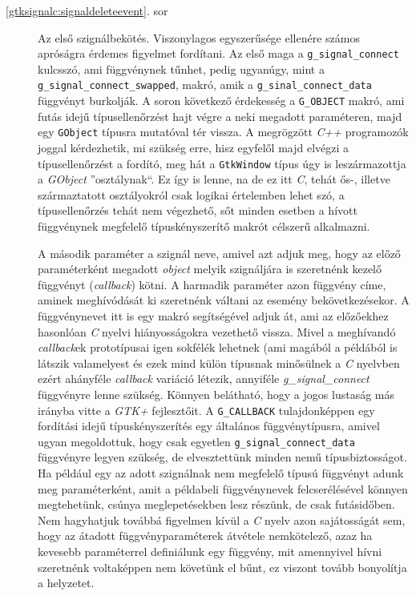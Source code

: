 \begin{description}
 \item[\ref{gtksignalc:signaldeleteevent}. sor] Az első szignálbekötés. Viszonylagos egyszerűsége ellenére számos apróságra érdemes figyelmet fordítani. Az első maga a \texttt{g\_signal\_connect} kulcsszó, ami függvénynek tűnhet, pedig ugyanúgy, mint a \texttt{g\_signal\_connect\_swapped}, makró, amik a \texttt{g\_sinal\_connect\_data} függvényt burkolják. A soron következő érdekesség a \texttt{G\_OBJECT} makró, ami futás idejű típusellenőrzést hajt végre a neki megadott paraméteren, majd egy \texttt{GObject} típusra mutatóval tér vissza. A megrögzött \textit{C++} programozók joggal kérdezhetik, mi szükség erre, hisz egyfelől majd elvégzi a típusellenőrzést a fordító, meg hát a \texttt{GtkWindow} típus úgy is leszármazottja a \textit{GObject} ''osztálynak``. Ez így is lenne, na de ez itt \textit{C}, tehát ős-, illetve származtatott osztályokról csak logikai értelemben lehet szó, a típusellenőrzés tehát nem végezhető, sőt minden esetben a hívott függvénynek megfelelő típuskényszerítő makrót célszerű alkalmazni.

 A második paraméter a szignál neve, amivel azt adjuk meg, hogy az előző paraméterként megadott \textit{object} melyik szignáljára is szeretnénk kezelő függvényt (\textit{callback}) kötni. A harmadik paraméter azon függvény címe, aminek meghívódását ki szeretnénk váltani az esemény bekövetkezésekor. A függvénynevet itt is egy makró segítségével adjuk át, ami az előzőekhez hasonlóan \textit{C} nyelvi hiányosságokra vezethető vissza. Mivel a meghívandó \textit{callback}ek prototípusai igen sokfélék lehetnek (ami magából a példából is látszik valamelyest és ezek mind külön típusnak minősülnek a \textit{C} nyelvben ezért ahányféle \textit{callback} variáció létezik, annyiféle \textit{g\_signal\_connect} függvényre lenne szükség. Könnyen belátható, hogy a jogos lustaság más irányba vitte a \textit{GTK+} fejlesztőit. A \texttt{G\_CALLBACK} tulajdonképpen egy fordítási idejű típuskényszerítés egy általános függvénytípusra, amivel ugyan megoldottuk, hogy csak egyetlen \texttt{g\_signal\_connect\_data} függvényre legyen szükség, de elvesztettünk minden nemű típusbiztosságot. Ha például egy az adott szignálnak nem megfelelő típusú függvényt adunk meg paraméterként, amit a példabeli függvénynevek felcserélésével könnyen megtehetünk, csúnya meglepetésekben lesz részünk, de csak futásidőben. Nem hagyhatjuk továbbá figyelmen kívül a \textit{C} nyelv azon sajátosságát sem, hogy az átadott függvényparaméterek átvétele nemkötelező, azaz ha kevesebb paraméterrel definiálunk egy függvény, mit amennyivel hívni szeretnénk voltaképpen nem követünk el bűnt, ez viszont tovább bonyolítja a helyzetet.


\end{description}
